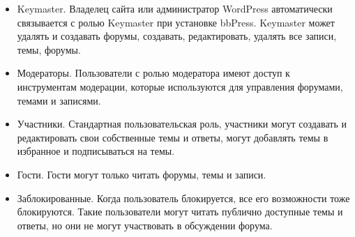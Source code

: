 \begin{itemize}
\item Keymaster. Владелец сайта или администратор WordPress автоматически связывается с ролью Keymaster при установке bbPress. Keymaster может удалять и создавать форумы, создавать, редактировать, удалять все записи, темы, форумы.
\item Модераторы. Пользователи с ролью модератора имеют доступ к инструментам модерации, которые используются для управления форумами, темами и записями.
\item Участники. Стандартная пользовательская роль, участники могут создавать и редактировать свои собственные темы и ответы, могут добавлять темы в избранное и подписываться на темы.
\item Гости. Гости могут только читать форумы, темы и записи.
\item Заблокированные. Когда пользователь блокируется, все его возможности тоже блокируются. Такие пользователи могут читать публично доступные темы и ответы, но они не могут участвовать в обсуждении форума.
\end{itemize}